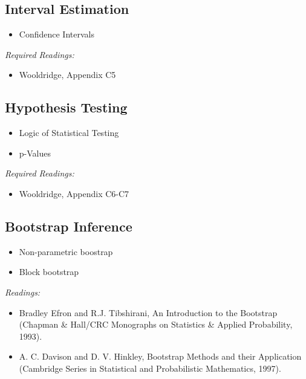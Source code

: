 \documentclass{article}
\begin{document}
\subsection{Interval Estimation}

\begin{itemize}
   \item Confidence Intervals
\end{itemize}
\textit{Required Readings:}
\begin{itemize}
  \item Wooldridge, Appendix C5
\end{itemize}
\subsection{Hypothesis Testing}
\begin{itemize}
   \item Logic of Statistical Testing
   \item p-Values
\end{itemize}
\textit{Required Readings:}
\begin{itemize}
  \item Wooldridge, Appendix C6-C7 
\end{itemize}

\subsection{Bootstrap Inference}

\begin{itemize}
  \item Non-parametric boostrap
  \item Block bootstrap
  \end{itemize}
\textit{Readings:}
\begin{itemize}
  \item Bradley Efron and R.J. Tibshirani, An Introduction to the Bootstrap
(Chapman \& Hall/CRC Monographs on Statistics \& Applied
Probability, 1993).
\item A. C. Davison and D. V. Hinkley, Bootstrap Methods and their
Application (Cambridge Series in Statistical and Probabilistic
Mathematics, 1997).
\end{itemize}


\end{document}
